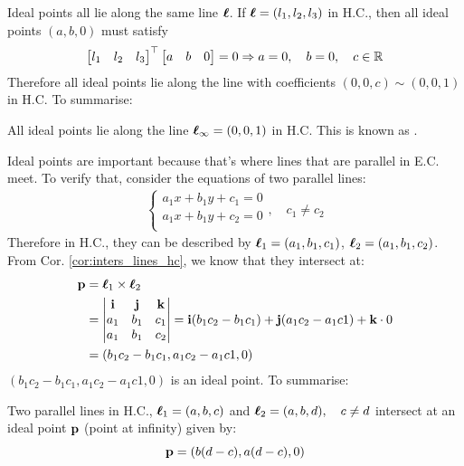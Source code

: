 \documentclass[a4paper]{article}
\begin{document}
Ideal points all lie along the same line $\boldsymbol{\ell}$. If $\boldsymbol{\ell} = (l_1,l_2,l_3)$ in H.C., then all ideal points $(a,b,0)$ must satisfy
\begin{align*}
    \begin{bmatrix}l_1 & l_2 & l_3\end{bmatrix}^{\top} \begin{bmatrix}a & b & 0\end{bmatrix} = 0 \Rightarrow
    a = 0, \quad b = 0,\quad c \in \mathbb{R}
\end{align*}
Therefore all ideal points lie along the line with coefficients $(0,0,c) \sim (0,0,1)$ in H.C. To summarise:
\begin{corollary}
All ideal points lie along the line $\boldsymbol{\ell}_{\infty} = (0,0,1)$ in H.C. This is known as .
\end{corollary}
Ideal points are important because that's where lines that are parallel in E.C. meet. To verify that, consider the equations of two parallel lines:
\begin{align*}
\left\{ 
\begin{matrix}
a_1x + b_1y + c_1 = 0\\
a_1x + b_1y + c_2 = 0 \\
\end{matrix}, \quad c_1 \neq c_2
\right.
\label{eq:2parallel_lines_ec}
\end{align*}
Therefore in H.C., they can be described by $\boldsymbol{\ell}_1 = (a_1, b_1, c_1)$, $\boldsymbol{\ell}_2 = (a_1, b_1, c_2)$. From Cor. \ref{cor:inters_lines_hc}, we know that they intersect at:
\begin{align*}
\textbf{p} &= \boldsymbol{\ell}_1 \times \boldsymbol{\ell}_2 \\  
&= \left|
\begin{matrix}
\textbf{i} & \textbf{j} & \textbf{k} \\
a_1 & b_1 & c_1 \\
a_1 & b_1 & c_2
\end{matrix}
\right| = \textbf{i} (b_1c_2 - b_1c_1) + \textbf{j} (a_1c_2 - a_1c1) + \textbf{k}\cdot 0 \\
&= (b_1c_2 - b_1c_1, a_1c_2 - a_1c1, 0)
\end{align*}
$(b_1c_2 - b_1c_1, a_1c_2 - a_1c1, 0)$ is an ideal point. To summarise:

\begin{corollary}
Two parallel lines in H.C., $\boldsymbol{\ell}_1 = (a, b, c)$ and $\boldsymbol{\ell}_2 = (a, b, d), \quad c \neq d$ intersect at an ideal point $\textbf{\textup{p}}$ (point at infinity) given by:
\begin{equation}
    \textbf{\textup{p}} = (b(d-c), a(d-c), 0)
\end{equation}
\end{corollary}
\end{document}
